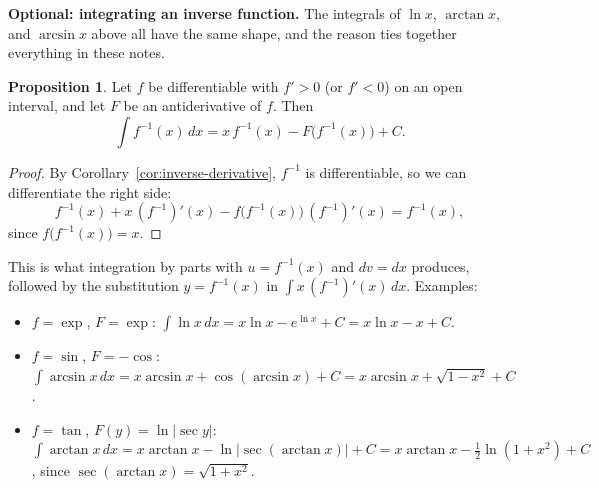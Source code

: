 \documentclass[12pt,letterpaper]{article}
\theoremstyle{definition}
\newtheorem{proposition}[theorem]{Proposition}
\begin{document}
\textbf{Optional: integrating an inverse function.} The integrals of
$\ln x$, $\arctan x$, and $\arcsin x$ above all have the same shape, and the
reason ties together everything in these notes.

\begin{proposition}
  Let $f$ be differentiable with $f'>0$ (or $f'<0$) on an open interval, and
  let $F$ be an antiderivative of $f$. Then
  \[
    \int f^{-1}(x)\,dx=x\,f^{-1}(x)-F\bigl(f^{-1}(x)\bigr)+C.
  \]
\end{proposition}

\begin{proof}
  By Corollary~\ref{cor:inverse-derivative}, $f^{-1}$ is differentiable, so
  we can differentiate the right side:
  \[
    f^{-1}(x)+x\,(f^{-1})'(x)-f\bigl(f^{-1}(x)\bigr)\,(f^{-1})'(x)
      =f^{-1}(x),
  \]
  since $f\bigl(f^{-1}(x)\bigr)=x$.
\end{proof}

This is what integration by parts with $u=f^{-1}(x)$ and $dv=dx$ produces,
followed by the substitution $y=f^{-1}(x)$ in $\int x\,(f^{-1})'(x)\,dx$.
Examples:
\begin{itemize}[itemsep=0.2em]
  \item $f=\exp$, $F=\exp$:\quad
    $\int\ln x\,dx=x\ln x-e^{\ln x}+C=x\ln x-x+C$.
  \item $f=\sin$, $F=-\cos$:\quad
    $\int\arcsin x\,dx=x\arcsin x+\cos(\arcsin x)+C
    =x\arcsin x+\sqrt{1-x^2}+C$.
  \item $f=\tan$, $F(y)=\ln|\sec y|$:\quad
    $\int\arctan x\,dx=x\arctan x-\ln\bigl|\sec(\arctan x)\bigr|+C
    =x\arctan x-\frac12\ln(1+x^2)+C$,
    since $\sec(\arctan x)=\sqrt{1+x^2}$.
\end{itemize}
\end{document}

